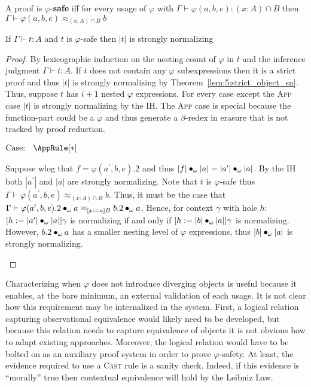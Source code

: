 \begin{definition}
    A proof is $\varphi$-\textbf{safe} iff for every usage of $\varphi$ with $\Gamma \vdash \varphi(a, b, e) : (x : A) \cap B$ then $\Gamma \vdash \varphi(a, b, e) \approx_{(x : A) \cap B} b$
\end{definition}

\begin{theorem}
    If $\Gamma \vdash t : A$ and $t$ is $\varphi$-safe then $|t|$ is strongly normalizing
\end{theorem}
\begin{proof}
    By lexicographic induction on the nesting count of $\varphi$ in $t$ and the inference judgment $\Gamma \vdash t : A$.
    If $t$ does not contain any $\varphi$ subexpressions then it is a strict proof and thus $|t|$ is strongly normalizing by Theorem~\ref{lem:5:strict_object_sn}.
    Thus, suppose $t$ has $i + 1$ nested $\varphi$ expressions.
    For every case except the \textsc{App} case $|t|$ is strongly normalizing by the IH.
    The \textsc{App} case is special because the function-part could be a $\varphi$ and thus generate a $\beta$-redex in erasure that is not tracked by proof reduction.

    $\text{Case: }\begin{array}{c} \AppRule[*] \end{array}$
    \begin{proofcase}
        Suppose wlog that $f = \varphi(a^\prime, b, e).2$ and thus $|f| \bullet_{\omega} |a| = |a^\prime| \bullet_{\omega} |a|$.
        By the IH both $|a^\prime|$ and $|a|$ are strongly normalizing.
        Note that $t$ is $\varphi$-safe thus $\Gamma \vdash \varphi(a^\prime, b, e) \approx_{(x : A) \cap B} b$.
        Thus, it must be the case that $\Gamma \vdash \varphi(a^\prime, b, e).2 \bullet_{\omega} a \approx_{[x := a]B} b.2 \bullet_{\omega} a$.
        Hence, for context $\gamma$ with hole $h$: $[h := |a^\prime| \bullet_{\omega} |a|]\gamma$ is normalizing if and only if $[h := |b| \bullet_{\omega} |a|]\gamma$ is normalizing.
        However, $b.2 \bullet_{\omega} a$ has a smaller nesting level of $\varphi$ expressions, thus $|b| \bullet_{\omega} |a|$ is strongly normalizing.
    \end{proofcase}
\end{proof}

Characterizing when $\varphi$ does not introduce diverging objects is useful because it enables, at the bare minimum, an external validation of each usage.
It is not clear how this requirement may be internalized in the system.
First, a logical relation capturing observational equivalence would likely need to be developed, but because this relation needs to capture equivalence of objects it is not obvious how to adapt existing approaches.
Moreover, the logical relation would have to be bolted on as an auxiliary proof system in order to prove $\varphi$-safety.
At least, the evidence required to use a \textsc{Cast} rule is a sanity check.
Indeed, if this evidence is ``morally'' true then contextual equivalence will hold by the Leibniz Law.

